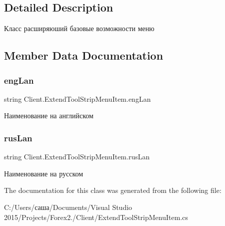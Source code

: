 \subsection{Detailed Description}
Класс расширяюший базовые возможности меню 



\subsection{Member Data Documentation}
\hypertarget{class_client_1_1_extend_tool_strip_menu_item_a71d1d698ca4315da70a0c2553c017c5f}{}\label{class_client_1_1_extend_tool_strip_menu_item_a71d1d698ca4315da70a0c2553c017c5f} 
\subsubsection{\texorpdfstring{eng\+Lan}{engLan}}
{\footnotesize\ttfamily string Client.\+Extend\+Tool\+Strip\+Menu\+Item.\+eng\+Lan}



Наименование на английском 

\hypertarget{class_client_1_1_extend_tool_strip_menu_item_abae1637b49f6f25f2a08eaa0a1e60fdc}{}\label{class_client_1_1_extend_tool_strip_menu_item_abae1637b49f6f25f2a08eaa0a1e60fdc} 
\subsubsection{\texorpdfstring{rus\+Lan}{rusLan}}
{\footnotesize\ttfamily string Client.\+Extend\+Tool\+Strip\+Menu\+Item.\+rus\+Lan}



Наименование на русском 



The documentation for this class was generated from the following file\+:\begin{DoxyCompactItemize}
\item 
C\+:/\+Users/саша/\+Documents/\+Visual Studio 2015/\+Projects/\+Forex2./\+Client/Extend\+Tool\+Strip\+Menu\+Item.\+cs\end{DoxyCompactItemize}
